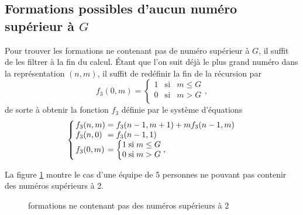 \documentclass[11pt]{article}
\begin{document}
\subsection{Formations possibles d'aucun numéro supérieur à $G$}
Pour trouver les formations ne contenant pas de numéro supérieur à $G$,
il suffit de les filtrer à la fin du calcul. Étant que l'on suit déjà
le plus grand numéro dans la représentation $(n,m)$, il suffit de
redéfinir la fin de la récursion par
\begin{equation*}
    f_3(0,m)=\left\{
        \begin{matrix}
            1&\text{si}&m\leq G\\
            0&\text{si}&m>    G\\
        \end{matrix}
    \right.,
\end{equation*}
de sorte à obtenir la fonction $f_3$ définie par le système d'équations
\begin{equation}\label{eq:f3}
    \arraycolsep=1.4pt\def\arraystretch{1}
    \left\{
        \begin{array}{lcl}
            f_3(n,m)&=&f_3(n-1,m+1)+mf_3(n-1,m)\\
            f_3(n,0)&=&f_3(n-1,1)\\
            f_3(0,m)&=&\left\{
                \begin{matrix}
                    1&\text{si}&m\leq G\\
                    0&\text{si}&m>    G\\
                \end{matrix}
            \right.,\\
        \end{array}
    \right.
\end{equation}

La figure \ref{fig:arbre_comb_s} montre le cas d'une équipe de 5 personnes
ne pouvant pas contenir des numéros supérieurs à 2.

\begin{figure}[H]
    \centering
    
    \caption{formations ne contenant pas des numéros supérieurs à 2}
    \label{fig:arbre_comb_s}
\end{figure}
\end{document}
